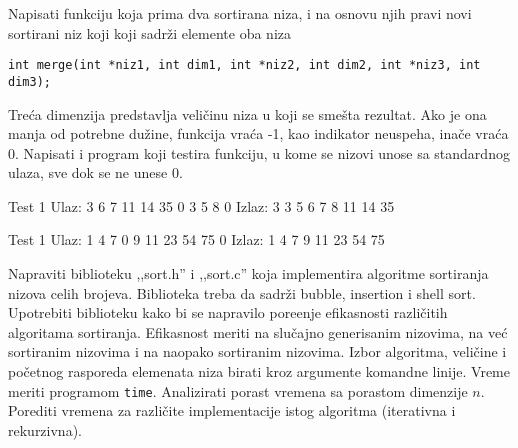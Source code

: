 \begin{Exercise}[label=505]
  Napisati funkciju koja prima dva sortirana niza, i na osnovu
  njih pravi novi sortirani niz koji koji sadr\v zi elemente oba niza
\begin{verbatim}
int merge(int *niz1, int dim1, int *niz2, int dim2, int *niz3, int dim3);
\end{verbatim}
Tre\' ca dimenzija predstavlja veli\v cinu niza u koji se sme\v sta
rezultat. Ako je ona manja od potrebne du\v zine, funkcija vra\' ca
-1, kao indikator neuspeha, ina\v ce vra\' ca 0. Napisati i program
koji testira funkciju, u kome se nizovi unose sa standardnog ulaza,
sve dok se ne unese 0.
  
  \begin{miditest}
    \begin{test}{Test 1}
      Ulaz:   3 6 7 11 14 35 0 3 5 8 0
      Izlaz:  3 3 5 6 7 8 11 14 35
    \end{test}
  \end{miditest}
  
  \begin{miditest}
    \begin{test}{Test 1}
      Ulaz:   1 4 7 0 9 11 23 54 75 0
      Izlaz:  1 4 7 9 11 23 54 75
    \end{test}
  \end{miditest}
  
\end{Exercise}

\begin{Exercise}[label=506]
  Napraviti biblioteku ,,sort.h'' i ,,sort.c'' koja implementira
  algoritme sortiranja nizova celih brojeva. Biblioteka treba da
  sadr\v zi bubble, insertion i shell sort. Upotrebiti biblioteku kako
  bi se napravilo pore\dj enje efikasnosti razli\v citih algoritama
  sortiranja. Efikasnost meriti na slu\v cajno generisanim nizovima,
  na ve\' c sortiranim nizovima i na naopako sortiranim
  nizovima. Izbor algoritma, veli\v cine i po\v cetnog rasporeda
  elemenata niza birati kroz argumente komandne linije.  Vreme meriti
  programom \verb|time|. Analizirati porast vremena sa porastom
  dimenzije $n$. Porediti vremena za razli\v cite implementacije istog
  algoritma (iterativna i rekurzivna).  
  
\end{Exercise}

